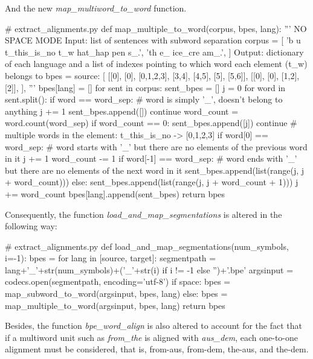 And the new \emph{map\_multiword\_to\_word} function.

\begin{python}
# extract_alignments.py
def map_multiple_to_word(corpus, bpes, lang):
  '''
  NO SPACE MODE
  Input: list of sentences with subword separation
  corpus =  [
    'b u t_this_is_no t_w hat_hap pen s_.',
    'th e_ ice_cre am_.',
  ]
  Output: dictionary of each language and 
  a list of indexes pointing to which word each element (t\_w) belongs to
  bpes = {
    source:
    [
      [[0], [0], [0,1,2,3], [3,4], [4,5], [5], [5,6]],
      [[0], [0], [1,2], [2]],
    ],
  }
  '''
  bpes[lang] = []
  for sent in corpus:
    sent_bpes = []
    j = 0
    for word in sent.split():
      if word == word_sep:
        # word is simply '_', doesn't belong to anything
        j += 1
        sent_bpes.append([])
        continue
      word_count = word.count(word_sep)
      if word_count == 0:
        sent_bpes.append([j])
        continue
      # multiple words in the element: t_this_is_no -> [0,1,2,3]
      if word[0] == word_sep:
        # word starts with '_' but there are no elements of the previous word in it
        j += 1
        word_count -= 1
      if word[-1] == word_sep:
        # word ends with '_' but there are no elements of the next word in it
        sent_bpes.append(list(range(j, j + word_count)))
      else:
        sent_bpes.append(list(range(j, j + word_count + 1)))
      j += word_count
    bpes[lang].append(sent_bpes)
  return bpes
\end{python}

Consequently, the function \emph{load\_and\_map\_segmentations} is altered in the following way:

\begin{python}
# extract_alignments.py
def load_and_map_segmentations(num_symbols, i=-1):
  bpes = {}
  for lang in [source, target]:
    segmentpath = lang+'_'+str(num_symbols)+('_'+str(i) if i != -1 else '')+'.bpe'
    argsinput = codecs.open(segmentpath, encoding='utf-8')
    if space:
        bpes = map_subword_to_word(argsinput, bpes, lang)
    else:
        bpes = map_multiple_to_word(argsinput, bpes, lang)
  return bpes
\end{python}

Besides, the function \emph{bpe\_word\_align} is also altered to account for the fact that if a multiword unit such as \emph{from\_the} is aligned with \emph{aus\_dem}, each one-to-one alignment must be considered, that is, from-aus, from-dem, the-aus, and the-dem.

